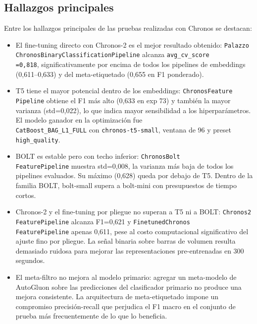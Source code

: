 \subsection{Hallazgos principales}
Entre los hallazgos principales de las pruebas realizadas con Chronos se destacan:
\begin{itemize}

\item El fine-tuning directo con Chronos-2 es el mejor resultado obtenido: \texttt{Palazzo} \\ \texttt{ChronosBinaryClassificationPipeline} alcanza \texttt{avg\_cv\_score}\\\texttt{=0,818}, significativamente por encima de todos los pipelines de embeddings (0,611--0,633) y del meta-etiquetado (0,655 en F1 ponderado).

\item T5 tiene el mayor potencial dentro de los embeddings: \texttt{ChronosFeature} \\ \texttt{Pipeline} obtiene el F1 más alto (0,633 en exp 73) y también la mayor varianza (std=0,022), lo que indica mayor sensibilidad a los hiperparámetros. El modelo ganador en la optimización fue \\\texttt{CatBoost\_BAG\_L1\_FULL} con \texttt{chronos-t5-small}, ventana de 96 y preset \texttt{high\_quality}.

\item BOLT es estable pero con techo inferior: \texttt{ChronosBolt} \\ \texttt{FeaturePipeline} muestra std=0,008, la varianza más baja de todos los pipelines evaluados. Su máximo (0,628) queda por debajo de T5. Dentro de la familia BOLT, bolt-small supera a bolt-mini con presupuestos de tiempo cortos.

\item Chronos-2 y el fine-tuning por pliegue no superan a T5 ni a BOLT: \texttt{Chronos2} \\\texttt{FeaturePipeline} alcanza F1=0,621 y \texttt{FinetunedChronos} \\\texttt{FeaturePipeline} apenas 0,611, pese al costo computacional significativo del ajuste fino por pliegue. La señal binaria sobre barras de volumen resulta demasiado ruidosa para mejorar las representaciones pre-entrenadas en 300 segundos.

\item El meta-filtro no mejora al modelo primario: agregar un meta-modelo de AutoGluon sobre las predicciones del clasificador primario no produce una mejora consistente. La arquitectura de meta-etiquetado impone un compromiso precisión-recall que perjudica el F1 macro en el conjunto de prueba más frecuentemente de lo que lo beneficia.

\end{itemize}

